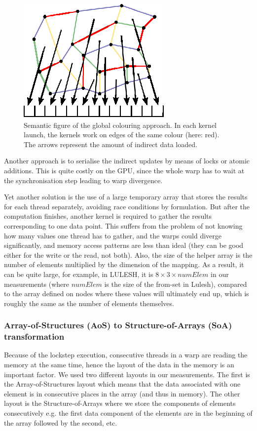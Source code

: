 \begin{figure}[Htpb]
  \centering
  \includegraphics{fig/svg/unstructured_global.eps}
  \caption{Semantic figure of the global colouring approach. In each kernel
  launch, the kernels work on edges of the same colour (here: red). The arrows
  represent the amount of indirect data loaded.}
  \label{fig:unstructured_global}
\end{figure}

Another approach is to serialise the indirect updates by means of locks or
atomic additions. This is quite costly on the GPU, since the whole warp has to
wait at the synchronisation step leading to warp divergence.

Yet another solution is the use of a large temporary array that stores the
results for each thread separately, avoiding race conditions by formulation. But
after the computation finishes, another kernel is required to gather the results
corresponding to one data point. This suffers from the problem of not knowing
how many values one thread has to gather, and the warps could diverge
significantly, and memory access patterns are less than ideal (they can be good
either for the write or the read, not both). Also, the size of the helper array
is the number of elements multiplied by the dimension of the mapping. As a
result, it can be quite large, for example, in LULESH, it is \(8 \times 3 \times
numElem \) in our measurements (where $numElem$ is the size of the from-set in
Lulesh), compared to the array defined on nodes where these values will
ultimately end up, which is roughly the same as the number of elements
themselves.

\subsubsection{Array-of-Structures (AoS) to Structure-of-Arrays (SoA)
transformation} \label{aos-to-soa}

Because of the lockstep execution, consecutive threads in a warp are reading the
memory at the same time, hence the layout of the data in the memory is an
important factor. We used two different layouts in our measurements. The first
is the Array-of-Structures layout which means that the data associated with one
element is in consecutive places in the array (and thus in memory). The other
layout is the Structure-of-Arrays where we store the components of elements
consecutively e.g.  the first data component of the elements are in the
beginning of the array followed by the second, etc.

